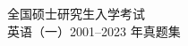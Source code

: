 

\pagestyle{empty}
\rule{0pt}{1pt}
\vfil
\begin{center}
	\heiti {}
	   全国硕士研究生入学考试 \\ 
	   英语（一）2001--2023 年真题集 
\end{center}

\vfil
